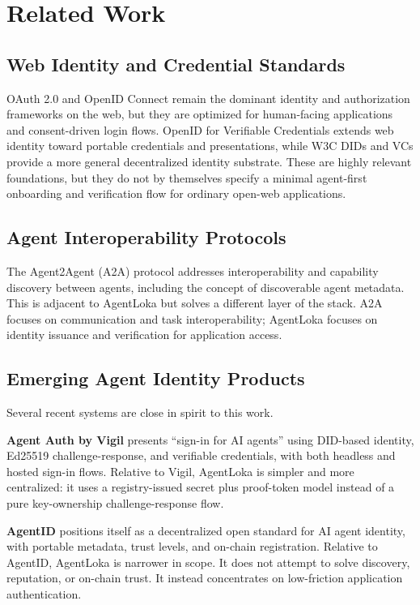 \documentclass[11pt]{article}
\begin{document}
\section{Related Work}

\subsection{Web Identity and Credential Standards}

OAuth 2.0 and OpenID Connect remain the dominant identity and authorization frameworks on the web, but they are optimized for human-facing applications and consent-driven login flows. OpenID for Verifiable Credentials extends web identity toward portable credentials and presentations, while W3C DIDs and VCs provide a more general decentralized identity substrate. These are highly relevant foundations, but they do not by themselves specify a minimal agent-first onboarding and verification flow for ordinary open-web applications.

\subsection{Agent Interoperability Protocols}

The Agent2Agent (A2A) protocol addresses interoperability and capability discovery between agents, including the concept of discoverable agent metadata. This is adjacent to AgentLoka but solves a different layer of the stack. A2A focuses on communication and task interoperability; AgentLoka focuses on identity issuance and verification for application access.

\subsection{Emerging Agent Identity Products}

Several recent systems are close in spirit to this work.

\textbf{Agent Auth by Vigil} presents ``sign-in for AI agents'' using DID-based identity, Ed25519 challenge-response, and verifiable credentials, with both headless and hosted sign-in flows. Relative to Vigil, AgentLoka is simpler and more centralized: it uses a registry-issued secret plus proof-token model instead of a pure key-ownership challenge-response flow.

\textbf{AgentID} positions itself as a decentralized open standard for AI agent identity, with portable metadata, trust levels, and on-chain registration. Relative to AgentID, AgentLoka is narrower in scope. It does not attempt to solve discovery, reputation, or on-chain trust. It instead concentrates on low-friction application authentication.
\end{document}
